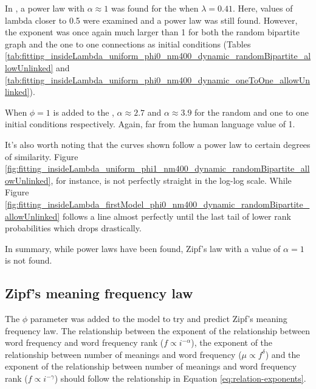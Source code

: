 In \cite{Ferrer2003a}, a power law with $\alpha \approx 1$ was found for the \secondmodel{} when $\lambda=0.41$.
Here, values of lambda closer to 0.5 were examined and a power law was still found.
However, the exponent was once again much larger than 1 for both the random bipartite graph and the one to one connections as initial conditions (Tables \ref{tab:fitting_insideLambda_uniform_phi0_nm400_dynamic_randomBipartite_allowUnlinked} and \ref{tab:fitting_insideLambda_uniform_phi0_nm400_dynamic_oneToOne_allowUnlinked}).

When $\phi=1$ is added to the \secondmodel{}, $\alpha \approx 2.7$ and $\alpha \approx 3.9$ for the random and one to one initial conditions respectively. Again, far from the human language value of 1.

It's also worth noting that the curves shown follow a power law to certain degrees of similarity.
Figure \ref{fig:fitting_insideLambda_uniform_phi1_nm400_dynamic_randomBipartite_allowUnlinked}, for instance, is not perfectly straight in the log-log scale.
While Figure \ref{fig:fitting_insideLambda_firstModel_phi0_nm400_dynamic_randomBipartite_allowUnlinked} follows a line almost perfectly until the last tail of lower rank probabilities which drops drastically.

In summary, while power laws have been found, Zipf's law with a value of $\alpha=1$ is not found.

\subsection{Zipf's meaning frequency law}
\label{sec:discussion_math_meaning-freq}

The $\phi$ parameter was added to the model to try and predict Zipf's meaning frequency law. \cite{Ferrer2018a}
The relationship between the exponent of the relationship between word frequency and word frequency rank ($f \propto i^{-\alpha}$), the exponent of the relationship between number of meanings and word frequency ($\mu \propto f^\delta$) and the exponent of the relationship between number of meanings and word frequency rank ($f \propto i^{-\gamma}$) should follow the relationship in Equation \eqref{eq:relation-exponents}.

